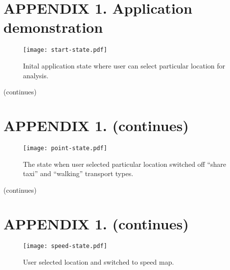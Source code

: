 
\renewcommand{\thefigure}{A\arabic{figure}}
\setcounter{figure}{0}


\section*{APPENDIX 1. Application demonstration}

\vfill

\begin{figure}[ht]
  \centering
  \captionsetup{justification=centering,margin=0.2cm}
  \texttt{[image: start-state.pdf]}
  \caption{Inital application state where user can select particular location for analysis.}
  \label{pic:startstate}
\end{figure}

\vfill
\begin{flushright}
  (continues)
\end{flushright}

\section*{APPENDIX 1. (continues)}

\vfill

\begin{figure}[ht]
  \centering
  \captionsetup{justification=centering,margin=0.2cm}
  \texttt{[image: point-state.pdf]}
  \caption{The state when user selected particular location switched off ``share taxi'' and
  ``walking'' transport types.}
  \label{pic:pointstate}
\end{figure}

\vfill
\begin{flushright}
  (continues)
\end{flushright}

\section*{APPENDIX 1. (continues)}

\vfill

\begin{figure}[ht]
  \centering
  \captionsetup{justification=centering,margin=0.2cm}
  \texttt{[image: speed-state.pdf]}
  \caption{User selected location and switched to speed map.}
  \label{pic:speedstate}
\end{figure}


